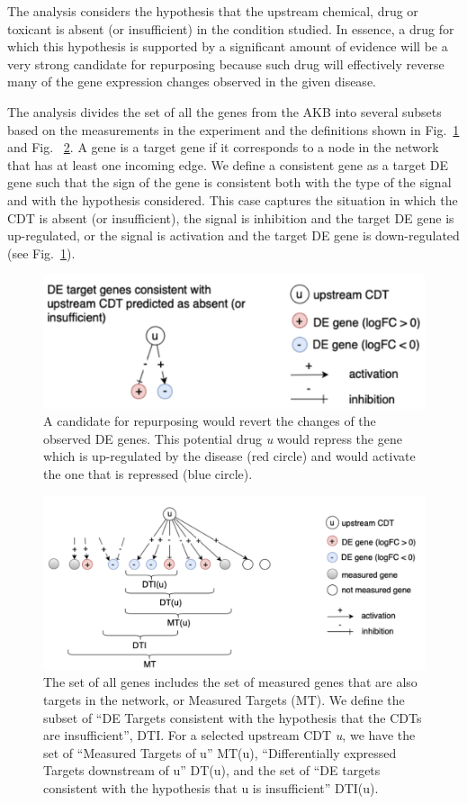 The analysis considers the hypothesis that  the upstream chemical, drug or toxicant is absent (or insufficient) in the condition studied. In essence, a drug for which this hypothesis is supported by a significant amount of evidence will be a very strong candidate for repurposing because such drug will effectively reverse many of the gene expression changes observed in the given disease. 


The analysis divides the set of all the genes from the AKB into several subsets based on the measurements in the experiment and the definitions shown in Fig.~\ref{TwoHypotheses} and Fig. ~\ref{MeasuredGenes}. 
A gene is a target gene if it corresponds to a node in the network that has at least one incoming edge. We define a consistent gene as a target DE gene such that the sign of the gene is consistent both with the type of the signal and with the hypothesis considered. 
This case captures the situation in which the CDT is absent (or insufficient), the signal is inhibition and the target DE gene is up-regulated, or the signal is activation and the target DE gene is down-regulated (see Fig.~\ref{TwoHypotheses}).

\begin{figure}
\centering
	\includegraphics[width=0.6\linewidth]{../Figures/TwoHypotheses.png}
        \caption{A candidate for repurposing would revert the changes of the  observed DE genes. This potential drug \emph{u} would repress the  gene which is up-regulated by the disease (red circle) and would activate the one that is repressed (blue circle). }
        \label{TwoHypotheses}
\end{figure}

\begin{figure}
	\includegraphics[width=0.9\linewidth]{../Figures/MeasuredGenes.png}
        \caption{The set of all genes includes the set of measured genes that are also targets in the network, or Measured Targets (MT). We define the subset of ``DE Targets consistent with the hypothesis that the CDTs are  insufficient'', DTI. For a selected upstream CDT \emph{u}, we have the set of ``Measured Targets of u'' MT(u), ``Differentially expressed Targets downstream of u'' DT(u), and the set of ``DE targets consistent with the hypothesis that u is insufficient'' DTI(u).}
        \label{MeasuredGenes}
\end{figure}

